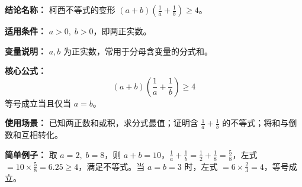 \textbf{结论名称：} 柯西不等式的变形 $(a+b)(\frac1a+\frac1b)\ge4$。

\textbf{适用条件：} $a>0,\;b>0$，即两正实数。

\textbf{变量说明：} $a,b$ 为正实数，常用于分母含变量的分式和。

\textbf{核心公式：} \[
\boxed{(a+b)\!\left(\frac{1}{a}+\frac{1}{b}\right)\ge 4}
\]
等号成立当且仅当 $a=b$。

\textbf{使用场景：} 已知两正数和或积，求分式最值；证明含 $\frac1a+\frac1b$ 的不等式；将和与倒数和互相转化。

\textbf{简单例子：} 取 $a=2,\;b=8$，则 $a+b=10$，$\frac1a+\frac1b=\frac12+\frac18=\frac58$，左式 $=10\times\frac58=6.25\ge4$，满足不等式。当 $a=b=3$ 时，左式 $=6\times\frac23=4$，等号成立。